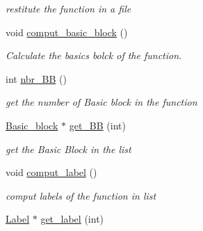 \begin{DoxyCompactItemize}
\begin{DoxyCompactList}\small\item\em restitute the function in a file \item\end{DoxyCompactList}\item 
\hypertarget{classFunction_a6094f123294ccbb891fa4145fd5b1b0a}{
void \hyperlink{classFunction_a6094f123294ccbb891fa4145fd5b1b0a}{comput\_\-basic\_\-block} ()}
\label{classFunction_a6094f123294ccbb891fa4145fd5b1b0a}

\begin{DoxyCompactList}\small\item\em Calculate the basics bolck of the function. \item\end{DoxyCompactList}\item 
\hypertarget{classFunction_a4ddde4ac1ff488dfcbfcaee71f727a48}{
int \hyperlink{classFunction_a4ddde4ac1ff488dfcbfcaee71f727a48}{nbr\_\-BB} ()}
\label{classFunction_a4ddde4ac1ff488dfcbfcaee71f727a48}

\begin{DoxyCompactList}\small\item\em get the number of Basic block in the function \item\end{DoxyCompactList}\item 
\hypertarget{classFunction_ae11968b8ca5497526e9448b67823d373}{
\hyperlink{classBasic__block}{Basic\_\-block} $\ast$ \hyperlink{classFunction_ae11968b8ca5497526e9448b67823d373}{get\_\-BB} (int)}
\label{classFunction_ae11968b8ca5497526e9448b67823d373}

\begin{DoxyCompactList}\small\item\em get the Basic Block in the list \item\end{DoxyCompactList}\item 
\hypertarget{classFunction_a1c8830219ce4306c22a933b17f54cc6f}{
void \hyperlink{classFunction_a1c8830219ce4306c22a933b17f54cc6f}{comput\_\-label} ()}
\label{classFunction_a1c8830219ce4306c22a933b17f54cc6f}

\begin{DoxyCompactList}\small\item\em comput labels of the function in list \item\end{DoxyCompactList}\item 
\hypertarget{classFunction_a4b2e9837c4b506b3c7a6d1488d9914d1}{
\hyperlink{classLabel}{Label} $\ast$ \hyperlink{classFunction_a4b2e9837c4b506b3c7a6d1488d9914d1}{get\_\-label} (int)}
\label{classFunction_a4b2e9837c4b506b3c7a6d1488d9914d1}


\end{DoxyCompactItemize}
